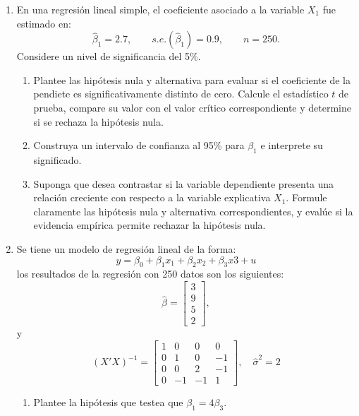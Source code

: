 \documentclass[10pt,a4paper]{article}
\begin{document}
\begin{enumerate}
    \item En una regresión lineal simple, el coeficiente asociado a la variable
        \(X_1\) fue estimado en:
        \[
          \hat\beta_1 = 2.7,
          \qquad s.e.(\hat\beta_1) = 0.9,
          \qquad n = 250.
        \]
        Considere un nivel de significancia del 5\%.

        \begin{enumerate}[label=\alph*)]
          \item Plantee las hipótesis nula y alternativa para evaluar si
                el coeficiente de la pendiete es significativamente distinto de cero.
      Calcule el estadístico \( t \) de prueba, compare su valor
                con el valor crítico correspondiente y determine si se
                rechaza la hipótesis nula.
          \item Construya un intervalo de confianza al 95\% para
                \( \beta_1 \) e interprete su significado.
                \item Suponga que desea contrastar si la variable dependiente presenta una relación creciente con respecto a la variable explicativa $X_1$.
Formule claramente las hipótesis nula y alternativa correspondientes, y evalúe si la evidencia empírica permite rechazar la hipótesis nula.
        \end{enumerate}

\item Se tiene un modelo de regresión lineal de la forma:
$$y=\beta_0 + \beta_1 x_1+\beta_2x_2+\beta_3 x3 + u$$
los resultados de la regresión con 250 datos son los siguientes:
        \[
          \hat{\beta} = \begin{bmatrix} 3 \\ 9 \\ 5 \\2 \end{bmatrix},
        \]
y 
        \[
          (X'X)^{-1} =
          \begin{bmatrix}
1 & 0  & 0  &  0\\
0 & 1  & 0  & -1\\
0 & 0  & 2  & -1\\
0 & -1 & -1 &  1
\end{bmatrix},
          \quad \hat{\sigma}^2 = 2
        \]
\begin{enumerate}
    \item Plantee la hipótesis que testea que $\beta_1=4\beta_3$.


\end{enumerate}
\end{enumerate}
\end{document}
